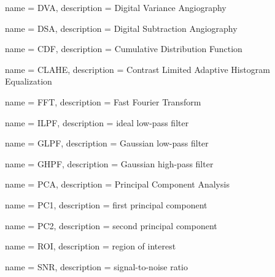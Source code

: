 {
  name = DVA,
  description = {Digital Variance Angiography}
}

{
  name = DSA,
  description = {Digital Subtraction Angiography}
}

{
  name = CDF,
  description = {Cumulative Distribution Function}
}

{
  name = CLAHE,
  description = {Contrast Limited Adaptive Histogram Equalization}
}

{
  name = FFT,
  description = {Fast Fourier Transform}
}

{
  name = ILPF,
  description = {ideal low-pass filter}
}

{
  name = GLPF,
  description = {Gaussian low-pass filter}
}

{
  name = GHPF,
  description = {Gaussian high-pass filter}
}

{
  name = PCA,
  description = {Principal Component Analysis}
}

{
  name = PC1,
  description = {first principal component}
}

{
  name = PC2,
  description = {second principal component}
}

{
  name = ROI,
  description = {region of interest}
}

{
  name = SNR,
  description = {signal-to-noise ratio}
}
